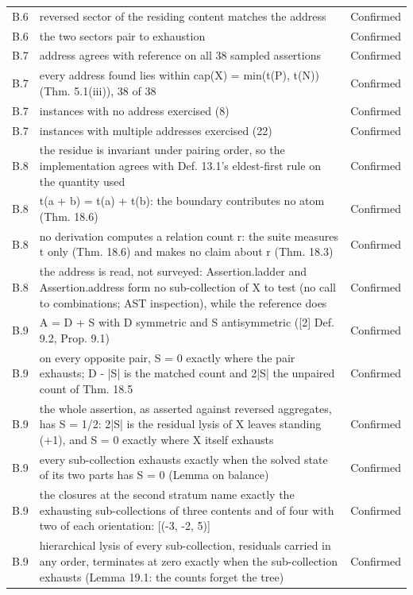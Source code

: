 \documentclass[pdflatex,sn-mathphys-num]{sn-jnl}
\theoremstyle{thmstyleone}%
\theoremstyle{thmstyletwo}%
\theoremstyle{thmstylethree}%
\begin{document}
\begin{appendices}
\begin{longtable}{@{} p{} p{} p{} @{}}
B.6 & reversed sector of the residing content matches the address & Confirmed \\
B.6 & the two sectors pair to exhaustion & Confirmed \\
B.7 & address agrees with reference on all 38 sampled assertions & Confirmed \\
B.7 & every address found lies within cap(X) = min(t(P), t(N)) (Thm. 5.1(iii)), 38 of 38 & Confirmed \\
B.7 & instances with no address exercised (8) & Confirmed \\
B.7 & instances with multiple addresses exercised (22) & Confirmed \\
B.8 & the residue is invariant under pairing order, so the implementation agrees with Def. 13.1's eldest-first rule on the quantity used & Confirmed \\
B.8 & t(a + b) = t(a) + t(b): the boundary contributes no atom (Thm. 18.6) & Confirmed \\
B.8 & no derivation computes a relation count r: the suite measures t only (Thm. 18.6) and makes no claim about r (Thm. 18.3) & Confirmed \\
B.8 & the address is read, not surveyed: Assertion.ladder and Assertion.address form no sub-collection of X to test (no call to combinations; AST inspection), while the reference does & Confirmed \\
B.9 & A = D + S with D symmetric and S antisymmetric ([2] Def. 9.2, Prop. 9.1) & Confirmed \\
B.9 & on every opposite pair, S = 0 exactly where the pair exhausts; D - |S| is the matched count and 2|S| the unpaired count of Thm. 18.5 & Confirmed \\
B.9 & the whole assertion, as asserted against reversed aggregates, has S = 1/2: 2|S| is the residual lysis of X leaves standing (+1), and S = 0 exactly where X itself exhausts & Confirmed \\
B.9 & every sub-collection exhausts exactly when the solved state of its two parts has S = 0 (Lemma on balance) & Confirmed \\
B.9 & the closures at the second stratum name exactly the exhausting sub-collections of three contents and of four with two of each orientation: [(-3, -2, 5)] & Confirmed \\
B.9 & hierarchical lysis of every sub-collection, residuals carried in any order, terminates at zero exactly when the sub-collection exhausts (Lemma 19.1: the counts forget the tree) & Confirmed \\

\end{longtable}
\end{appendices}
\end{document}
